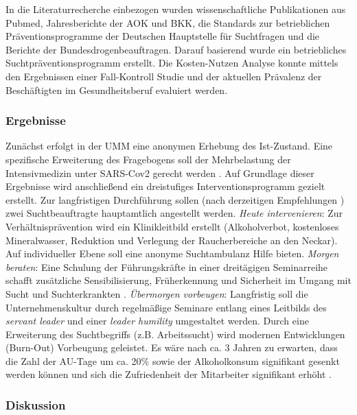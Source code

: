 \documentclass[a4paper]{article}
\begin{document}
In die Literaturrecherche einbezogen wurden wissenschaftliche Publikationen aus Pubmed, Jahresberichte der AOK und BKK, die Standards zur betrieblichen Präventionsprogramme der Deutschen Hauptstelle für Suchtfragen und die Berichte der Bundesdrogenbeauftragen. Darauf basierend wurde ein betriebliches Suchtpräventionsprogramm erstellt. Die Kosten-Nutzen Analyse konnte mittels den Ergebnissen einer Fall-Kontroll Studie   und der aktuellen Prävalenz der Beschäftigten im Gesundheitsberuf evaluiert werden.

\subsubsection*{Ergebnisse}


Zunächst erfolgt in der UMM eine anonymen Erhebung  des Ist-Zustand. Eine spezifische Erweiterung des Fragebogens soll der Mehrbelastung der Intensivmedizin unter SARS-Cov2 gerecht werden . Auf Grundlage dieser Ergebnisse wird anschließend ein dreistufiges Interventionsprogramm gezielt erstellt. Zur langfristigen Durchführung sollen (nach derzeitigen Empfehlungen ) zwei Suchtbeauftragte hauptamtlich angestellt werden. \textit{Heute intervenieren}: Zur Verhältnisprävention wird ein Klinikleitbild erstellt (Alkoholverbot, kostenloses Mineralwasser, Reduktion und Verlegung der Raucherbereiche an den Neckar). Auf individueller Ebene soll eine anonyme Suchtambulanz Hilfe bieten. \textit{Morgen beraten}: Eine Schulung der Führungskräfte in einer dreitägigen Seminarreihe schafft zusätzliche Sensibilisierung, Früherkennung und Sicherheit im Umgang mit Sucht und Suchterkrankten . \textit{Übermorgen vorbeugen}: Langfristig soll die Unternehmenskultur durch regelmäßige Seminare entlang eines Leitbilds des \textit{servant leader} und einer \textit{leader humility} umgestaltet werden. Durch eine Erweiterung des Suchtbegriffs (z.B. Arbeitssucht) wird modernen Entwicklungen (Burn-Out) Vorbeugung geleistet. Es wäre nach ca. 3 Jahren zu erwarten, dass die Zahl der AU-Tage um ca. 20\% sowie der Alkoholkonsum signifikant gesenkt werden können und sich die Zufriedenheit der Mitarbeiter signifikant erhöht .

\subsubsection*{Diskussion}
\end{document}
